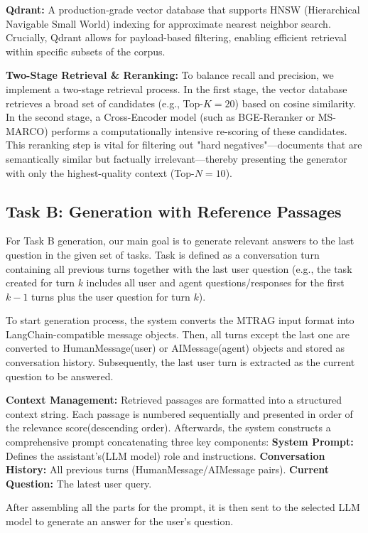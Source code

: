 \documentclass[11pt]{article}
\begin{document}
\vspace

\textbf{Qdrant:} A production-grade vector database that supports HNSW (Hierarchical Navigable Small World) indexing for approximate nearest neighbor search. Crucially, Qdrant allows for payload-based filtering, enabling efficient retrieval within specific subsets of the corpus.
    
    \textbf{Two-Stage Retrieval \& Reranking:}
    To balance recall and precision, we implement a two-stage retrieval process. In the first stage, the vector database retrieves a broad set of candidates (e.g., Top-$K=20$) based on cosine similarity. In the second stage, a Cross-Encoder model (such as BGE-Reranker or MS-MARCO) performs a computationally intensive re-scoring of these candidates. This reranking step is vital for filtering out "hard negatives"—documents that are semantically similar but factually irrelevant—thereby presenting the generator with only the highest-quality context (Top-$N=10$).

\subsection{Task B: Generation with Reference Passages}
For Task B generation, our main goal is to generate relevant answers to the last question in the given set of tasks. 
Task is defined as a conversation turn containing all previous turns together with the last user question (e.g., the task created for turn $k$ includes all user and agent questions/responses for the first $k−1$ turns plus the user question for turn $k$).

To start generation process, the system converts the MTRAG input format into LangChain-compatible message objects. Then,
all turns except the last one are converted to HumanMessage(user) or AIMessage(agent) objects and stored as conversation history. Subsequently, the last user turn is extracted as the current question to be answered.
\vspace

\textbf{Context Management:}
Retrieved passages are formatted into a structured context  string. Each passage is numbered sequentially and presented in order of the relevance score(descending order).
Afterwards, the system constructs a comprehensive prompt concatenating three key components:
\textbf{System Prompt:} Defines the assistant's(LLM model) role and instructions.
\textbf{Conversation History:} All previous turns (HumanMessage/AIMessage pairs).
\textbf{Current Question:} The latest user query.

After assembling all the parts for the prompt, it is then sent to the selected LLM model to generate an answer for the user's question.
\end{document}
